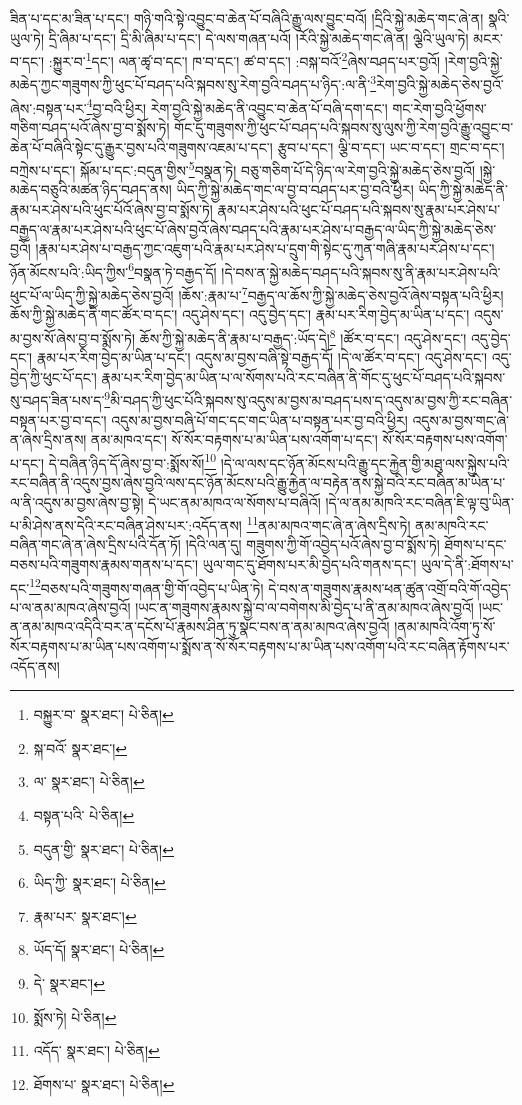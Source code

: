 ཟིན་པ་དང་མ་ཟིན་པ་དང་། གཉི་གའི་སྟེ་འབྱུང་བ་ཆེན་པོ་བཞིའི་རྒྱུ་ལས་བྱུང་བའོ། །དྲིའི་སྐྱེ་མཆེད་གང་ཞེ་ན། སྣའི་ཡུལ་ཏེ། དྲི་ཞིམ་པ་དང་། དྲི་མི་ཞིམ་པ་དང་། དེ་ལས་གཞན་པའོ། །རོའི་སྐྱེ་མཆེད་གང་ཞེ་ན། ལྕེའི་ཡུལ་ཏེ། མངར་བ་དང་། :སྐྱུར་བ་\footnote{བསྐྱུར་བ་  སྣར་ཐང་།  པེ་ཅིན། }དང་། ལན་ཚྭ་བ་དང་། ཁ་བ་དང་། ཚ་བ་དང་། :བསྐ་བའོ་\footnote{སྐ་བའོ་  སྣར་ཐང་། }ཞེས་བཤད་པར་བྱའོ། །རེག་བྱའི་སྐྱེ་མཆེད་ཀྱང་གཟུགས་ཀྱི་ཕུང་པོ་བཤད་པའི་སྐབས་སུ་རེག་བྱའི་བཤད་པ་ཉིད་:ལ་ནི་\footnote{ལ་  སྣར་ཐང་།  པེ་ཅིན། }རེག་བྱའི་སྐྱེ་མཆེད་ཅེས་བྱའོ་ཞེས་:བསྟན་པར་\footnote{བསྟན་པའི་  པེ་ཅིན། }བྱ་བའི་ཕྱིར། རེག་བྱའི་སྐྱེ་མཆེད་ནི་འབྱུང་བ་ཆེན་པོ་བཞི་དག་དང་། གང་རེག་བྱའི་ཕྱོགས་གཅིག་བཤད་པའོ་ཞེས་བྱ་བ་སྨོས་ཏེ། གོང་དུ་གཟུགས་ཀྱི་ཕུང་པོ་བཤད་པའི་སྐབས་སུ་ལུས་ཀྱི་རེག་བྱའི་རྒྱུ་འབྱུང་བ་ཆེན་པོ་བཞིའི་སྟེང་དུ་རྒྱུར་བྱས་པའི་གཟུགས་འཇམ་པ་དང་། རྩུབ་པ་དང་། ལྕི་བ་དང་། ཡང་བ་དང་། གྲང་བ་དང་། བཀྲེས་པ་དང་། སྐོམ་པ་དང་:བདུན་གྱིས་\footnote{བདུན་གྱི་  སྣར་ཐང་།  པེ་ཅིན། }བསྣན་ཏེ། བཅུ་གཅིག་པོ་དེ་ཉིད་ལ་རེག་བྱའི་སྐྱེ་མཆེད་ཅེས་བྱའོ། །སྐྱེ་མཆེད་བཅུའི་མཚན་ཉིད་བཤད་ནས། ཡིད་ཀྱི་སྐྱེ་མཆེད་གང་ལ་བྱ་བ་བཤད་པར་བྱ་བའི་ཕྱིར། ཡིད་ཀྱི་སྐྱེ་མཆེད་ནི་རྣམ་པར་ཤེས་པའི་ཕུང་པོའོ་ཞེས་བྱ་བ་སྨོས་ཏེ། རྣམ་པར་ཤེས་པའི་ཕུང་པོ་བཤད་པའི་སྐབས་སུ་རྣམ་པར་ཤེས་པ་བརྒྱད་ལ་རྣམ་པར་ཤེས་པའི་ཕུང་པོ་ཞེས་བྱའོ་ཞེས་བཤད་པའི་རྣམ་པར་ཤེས་པ་བརྒྱད་ལ་ཡིད་ཀྱི་སྐྱེ་མཆེད་ཅེས་བྱའོ། །རྣམ་པར་ཤེས་པ་བརྒྱད་ཀྱང་འཇུག་པའི་རྣམ་པར་ཤེས་པ་དྲུག་གི་སྟེང་དུ་ཀུན་གཞི་རྣམ་པར་ཤེས་པ་དང་། ཉོན་མོངས་པའི་:ཡིད་ཀྱིས་\footnote{ཡིད་ཀྱི་  སྣར་ཐང་།  པེ་ཅིན། }བསྣན་ཏེ་བརྒྱད་དོ། །དེ་བས་ན་སྐྱེ་མཆེད་བཤད་པའི་སྐབས་སུ་ནི་རྣམ་པར་ཤེས་པའི་ཕུང་པོ་ལ་ཡིད་ཀྱི་སྐྱེ་མཆེད་ཅེས་བྱའོ། །ཆོས་:རྣམ་པ་\footnote{རྣམ་པར་  སྣར་ཐང་། }བརྒྱད་ལ་ཆོས་ཀྱི་སྐྱེ་མཆེད་ཅེས་བྱའོ་ཞེས་བསྟན་པའི་ཕྱིར། ཆོས་ཀྱི་སྐྱེ་མཆེད་ནི་གང་ཚོར་བ་དང་། འདུ་ཤེས་དང་། འདུ་བྱེད་དང་། རྣམ་པར་རིག་བྱེད་མ་ཡིན་པ་དང་། འདུས་མ་བྱས་སོ་ཞེས་བྱ་བ་སྨོས་ཏེ། ཆོས་ཀྱི་སྐྱེ་མཆེད་ནི་རྣམ་པ་བརྒྱད་:ཡོད་དེ།\footnote{ཡོད་དོ།  སྣར་ཐང་།  པེ་ཅིན། } །ཚོར་བ་དང་། འདུ་ཤེས་དང་། འདུ་བྱེད་དང་། རྣམ་པར་རིག་བྱེད་མ་ཡིན་པ་དང་། འདུས་མ་བྱས་བཞི་སྟེ་བརྒྱད་དོ། །དེ་ལ་ཚོར་བ་དང་། འདུ་ཤེས་དང་། འདུ་བྱེད་ཀྱི་ཕུང་པོ་དང་། རྣམ་པར་རིག་བྱེད་མ་ཡིན་པ་ལ་སོགས་པའི་རང་བཞིན་ནི་གོང་དུ་ཕུང་པོ་བཤད་པའི་སྐབས་སུ་བཤད་ཟིན་པས་ད་\footnote{དེ་  སྣར་ཐང་། }མི་བཤད་ཀྱི་ཕུང་པོའི་སྐབས་སུ་འདུས་མ་བྱས་མ་བཤད་པས་ད་འདུས་མ་བྱས་ཀྱི་རང་བཞིན་བསྟན་པར་བྱ་བ་དང་། འདུས་མ་བྱས་བཞི་པོ་གང་དང་གང་ཡིན་པ་བསྟན་པར་བྱ་བའི་ཕྱིར། འདུས་མ་བྱས་གང་ཞེ་ན་ཞེས་དྲིས་ནས། ནམ་མཁའ་དང་། སོ་སོར་བརྟགས་པ་མ་ཡིན་པས་འགོག་པ་དང་། སོ་སོར་བརྟགས་པས་འགོག་པ་དང་། དེ་བཞིན་ཉིད་དོ་ཞེས་བྱ་བ་:སྨོས་སོ།\footnote{སྨོས་ཏེ།  པེ་ཅིན། } །དེ་ལ་ལས་དང་ཉོན་མོངས་པའི་རྒྱུ་དང་རྐྱེན་གྱི་མཐུ་ལས་སྐྱེས་པའི་རང་བཞིན་ནི་འདུས་བྱས་ཞེས་བྱའི་ལས་དང་ཉོན་མོངས་པའི་རྒྱུ་རྐྱེན་ལ་བརྟེན་ནས་སྐྱེ་བའི་རང་བཞིན་མ་ཡིན་པ་ལ་ནི་འདུས་མ་བྱས་ཞེས་བྱ་སྟེ། དེ་ཡང་ནམ་མཁའ་ལ་སོགས་པ་བཞིའོ། །དེ་ལ་ནམ་མཁའི་རང་བཞིན་ཇི་ལྟ་བུ་ཡིན་པ་མི་ཤེས་ནས་དེའི་རང་བཞིན་ཤེས་པར་:འདོད་ནས། \footnote{འདོད་  སྣར་ཐང་།  པེ་ཅིན། }ནམ་མཁའ་གང་ཞེ་ན་ཞེས་དྲིས་ཏེ། ནམ་མཁའི་རང་བཞིན་གང་ཞེ་ན་ཞེས་དྲིས་པའི་དོན་ཏོ། །དེའི་ལན་དུ། གཟུགས་ཀྱི་གོ་འབྱེད་པའོ་ཞེས་བྱ་བ་སྨོས་ཏེ། ཐོགས་པ་དང་བཅས་པའི་གཟུགས་རྣམས་གནས་པ་དང་། ཡུལ་གང་དུ་ཐོགས་པར་མི་བྱེད་པའི་གནས་དང་། ཡུལ་དེ་ནི་:ཐོགས་པ་དང་\footnote{ཐོགས་པ་  སྣར་ཐང་།  པེ་ཅིན། }བཅས་པའི་གཟུགས་གཞན་གྱི་གོ་འབྱེད་པ་ཡིན་ཏེ། དེ་བས་ན་གཟུགས་རྣམས་ཕན་ཚུན་འགྲོ་བའི་གོ་འབྱེད་པ་ལ་ནམ་མཁའ་ཞེས་བྱའོ། །ཡང་ན་གཟུགས་རྣམས་སྐྱེ་བ་ལ་བགེགས་མི་བྱེད་པ་ནི་ནམ་མཁའ་ཞེས་བྱའོ། །ཡང་ན་ནམ་མཁའ་འདིའི་བར་ན་དངོས་པོ་རྣམས་ཤིན་ཏུ་སྣང་བས་ན་ནམ་མཁའ་ཞེས་བྱའོ། །ནམ་མཁའི་འོག་ཏུ་སོ་སོར་བརྟགས་པ་མ་ཡིན་པས་འགོག་པ་སྨོས་ན་སོ་སོར་བརྟགས་པ་མ་ཡིན་པས་འགོག་པའི་རང་བཞིན་རྟོགས་པར་འདོད་ནས། 
